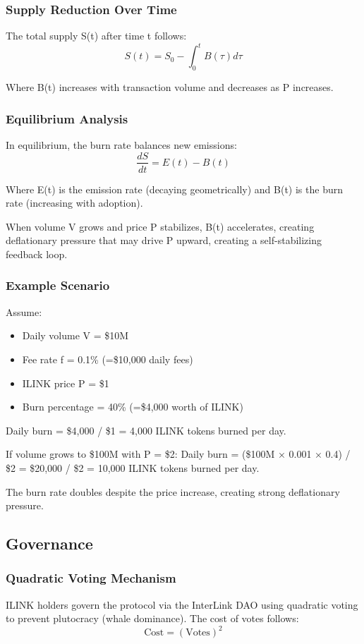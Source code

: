 \documentclass[11pt,a4paper]{article}
\begin{document}
\subsubsection{Supply Reduction Over Time}
The total supply S(t) after time t follows:
$$ S(t) = S_0 - \int_0^t B(\tau) d\tau $$

Where B(t) increases with transaction volume and decreases as P increases.

\subsubsection{Equilibrium Analysis}
In equilibrium, the burn rate balances new emissions:
$$ \frac{dS}{dt} = E(t) - B(t) $$

Where E(t) is the emission rate (decaying geometrically) and B(t) is the burn rate (increasing with adoption).

When volume V grows and price P stabilizes, B(t) accelerates, creating deflationary pressure that may drive P upward, creating a self-stabilizing feedback loop.

\subsubsection{Example Scenario}
Assume:
\begin{itemize}
    \item Daily volume V = \$10M
    \item Fee rate f = 0.1\% (=\$10,000 daily fees)
    \item ILINK price P = \$1
    \item Burn percentage = 40\% (=\$4,000 worth of ILINK)
\end{itemize}

Daily burn = \$4,000 / \$1 = 4,000 ILINK tokens burned per day.

If volume grows to \$100M with P = \$2:
Daily burn = (\$100M × 0.001 × 0.4) / \$2 = \$20,000 / \$2 = 10,000 ILINK tokens burned per day.

The burn rate doubles despite the price increase, creating strong deflationary pressure.

\subsection{Governance}

\subsubsection{Quadratic Voting Mechanism}
ILINK holders govern the protocol via the InterLink DAO using quadratic voting to prevent plutocracy (whale dominance). The cost of votes follows:
$$ \text{Cost} = (\text{Votes})^2 $$
\end{document}
